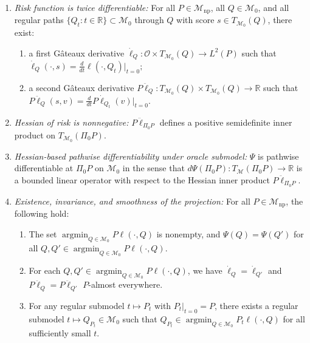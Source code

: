 \documentclass[11pt]{article}
\DeclareMathOperator*{\argmin}{argmin}
\theoremstyle{definition}
\begin{document}
\begin{enumerate}[label=(A\arabic*), ref=A\arabic*,series=cond]
\item \textit{Risk function is twice differentiable:} \label{cond::losssmooth}
For all \(P \in \mathcal{M}_{\mathrm{np}}\), all \(Q \in \mathcal{M}_0\), and all regular paths \(\{Q_t : t \in \mathbb{R}\} \subset \mathcal{M}_0\) through \(Q\) with score \(s \in T_{\mathcal{M}_0}(Q)\), there exist:
\begin{enumerate}
    \item[(i)] a first G\^{a}teaux derivative \(\dot{\ell}_{Q} : \mathcal{O} \times T_{\mathcal{M}_0}(Q) \to L^2(P)\) such that $\dot{\ell}_{Q}(\cdot,s) = \frac{d}{dt} \ell(\cdot, Q_t)\Big|_{t=0};$
    \item[(ii)] a second G\^{a}teaux derivative \(P\ddot{\ell}_{Q} : T_{\mathcal{M}_0}(Q) \times T_{\mathcal{M}_0}(Q) \to \mathbb{R}\) such that
    $P\ddot{\ell}_{Q}(s,v) = \frac{d}{dt} P\dot{\ell}_{Q_t}(v)\Big|_{t=0}.$
\end{enumerate}
\item \textit{Hessian of risk is nonnegative:} \label{cond::innerproductloss} $P \ddot{\ell}_{\Pi_0 P}$ defines a positive semidefinite inner product on $T_{\mathcal{M}_0}(\Pi_0 P)$.
\item \textit{Hessian-based pathwise differentiability under oracle submodel:} \label{cond::oraclepathwise} 
$\Psi$ is pathwise differentiable at $\Pi_0 P$ on $\mathcal{M}_0$ in the sense that 
$d\Psi(\Pi_0 P): T_{\mathcal{M}}(\Pi_0 P) \rightarrow \mathbb{R}$ is a bounded linear operator with respect to the Hessian inner product $P\ddot{\ell}_{\Pi_0 P}$.
\item \textit{Existence, invariance, and smoothness of the projection:} \label{cond::invariance}    \label{cond::smoothprojection}
For all \(P \in \mathcal{M}_{\mathrm{np}}\), the following hold:
\begin{enumerate}[label=(\roman*), ref=\ref{cond::invariance}.\roman* ]
    \item \label{cond::invariance-i}
    The set \(\argmin_{Q \in \mathcal{M}_0} P\ell(\cdot, Q)\) is nonempty, and \(\Psi(Q) = \Psi(Q')\) for all
    \(Q, Q' \in \argmin_{Q \in \mathcal{M}_0} P\ell(\cdot, Q)\).

    \item \label{cond::invariance-ii}
    For each \(Q, Q' \in \argmin_{Q \in \mathcal{M}_0} P\ell(\cdot, Q)\), we have
    \(\dot{\ell}_{Q} = \dot{\ell}_{Q'}\) and \(P\ddot{\ell}_{Q} = P\ddot{\ell}_{Q'}\) \(P\)-almost everywhere.

    \item \label{cond::smoothprojection2}
    For any regular submodel \(t \mapsto P_t\) with \(P_t|_{t=0} = P\), there exists a regular submodel
    \(t \mapsto Q_{P_t} \in \mathcal{M}_0\) such that \(Q_{P_t} \in \argmin_{Q \in \mathcal{M}_0} P_t\ell(\cdot, Q)\)
    for all sufficiently small \(t\).
\end{enumerate}

\end{enumerate}
 
\end{document}
